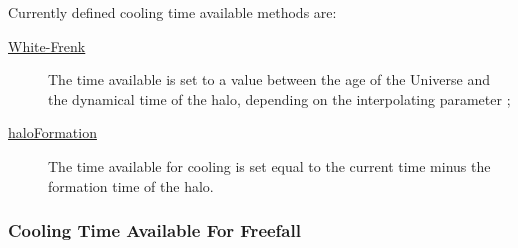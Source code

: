 Currently defined cooling time available methods are:
\begin{description}
 \item [\hyperlink{cooling.time_available.White-Frenk.F90:cooling_time_available_white_frenk:cooling_time_available_wf}{{\normalfont \ttfamily White-Frenk}}] The time available is set to a value between the age of the Universe and the dynamical time of the halo, depending on the interpolating parameter {\normalfont \ttfamily [coolingTimeAvailableAgeFactor]};
 \item [\hyperlink{cooling.time_available.halo_formation.F90:cooling_times_available_halo_formation:cooling_time_available_halo_formation}{{\normalfont \ttfamily haloFormation}}] The time available for cooling is set equal to the current time minus the formation time of the halo.
\end{description}

\subsubsection{Cooling Time Available For Freefall}

